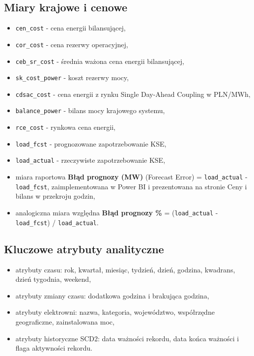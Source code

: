 \documentclass[12pt]{article}
\begin{document}
	\subsection{Miary krajowe i cenowe}
	\begin{itemize}
		\item \texttt{cen\_cost} - cena energii bilansującej,
		\item \texttt{cor\_cost} - cena rezerwy operacyjnej,
		\item \texttt{ceb\_sr\_cost} - średnia ważona cena energii bilansującej,
		\item \texttt{sk\_cost\_power} - koszt rezerwy mocy,
		\item \texttt{cdsac\_cost} - cena energii z rynku Single Day-Ahead Coupling w PLN/MWh,
		\item \texttt{balance\_power} - bilans mocy krajowego systemu,
		\item \texttt{rce\_cost} - rynkowa cena energii,
		\item \texttt{load\_fcst} - prognozowane zapotrzebowanie KSE,
		\item \texttt{load\_actual} - rzeczywiste zapotrzebowanie KSE,
		\item miara raportowa \textbf{Błąd prognozy (MW)} (Forecast Error) = \texttt{load\_actual} - \texttt{load\_fcst}, zaimplementowana w Power BI i prezentowana na stronie Ceny i bilans w przekroju godzin,
		\item analogiczna miara względna \textbf{Błąd prognozy \%} = (\texttt{load\_actual} - \texttt{load\_fcst}) / \texttt{load\_actual}.
	\end{itemize}

	\subsection{Kluczowe atrybuty analityczne}
	\begin{itemize}
		\item atrybuty czasu: rok, kwartał, miesiąc, tydzień, dzień, godzina, kwadrans, dzień tygodnia, weekend,
		\item atrybuty zmiany czasu: dodatkowa godzina i brakująca godzina,
		\item atrybuty elektrowni: nazwa, kategoria, województwo, współrzędne geograficzne, zainstalowana moc,
		\item atrybuty historyczne SCD2: data ważności rekordu, data końca ważności i flaga aktywności rekordu.
	\end{itemize}
\end{document}
